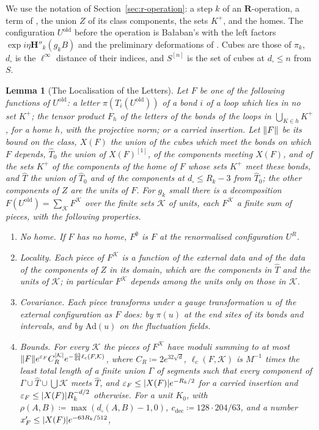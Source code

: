 \documentclass[11pt]{preprint}
\DeclarePairedDelimiter{\abs}{\lvert}{\rvert}
\DeclarePairedDelimiter{\norm}{\lVert}{\rVert}
\numberwithin{equation}{section}
\newtheorem{lemma}{Lemma}[section]
\theoremstyle{definition}
\theoremstyle{remark}
\theoremstyle{plain}
\begin{document}
We use the notation of Section~\ref{sec:r-operation}: a step $k$ of an $\mathbf R$-operation, a term of \cite[(1.72), p.~379]{BalabanLFR2}, the union $Z$ of its class components, the sets $K^+$, and the homes. The configuration $U^{\mathrm{old}}$ before the operation is Ba{\l}aban's \cite[(1.61)]{BalabanLFR2} with the left factors $\exp i\eta\mathbf H''_k(g_kB)$ and the preliminary deformations of \cite[p.~191, ll.~39--41]{BalabanLFR1}. Cubes are those of $\pi_k$, $d_\square$ is the $\ell^\infty$ distance of their indices, and $S^{[n]}$ is the set of cubes at $d_\square \leq n$ from $S$.

\begin{lemma}[The Localisation of the Letters]\label{lem:loop-localisation}
Let $F$ be one of the following functions of $U^{\mathrm{old}}$: a letter $\pi(T_i(U^{\mathrm{old}}))$ of a bond $i$ of a loop which lies in no set $K^+$; the tensor product $F_h$ of the letters of the bonds of the loops in $\bigcup_{K \in h}K^+$, for a home $h$, with the projective norm; or a carried insertion. Let $\norm F$ be its bound on the class, $X(F)$ the union of the cubes which meet the bonds on which $F$ depends, $\hat T_0$ the union of $X(F)^{[1]}$, of the components meeting $X(F)$, and of the sets $K^+$ of the components of the home of $F$ whose sets $K^+$ meet these bonds, and $\hat T$ the union of $\hat T_0$ and of the components at $d_\square \leq R_k - 3$ from $\hat T_0$; the other components of $Z$ are the \emph{units} of $F$. For $g_k$ small there is a decomposition $F(U^{\mathrm{old}}) = \sum_{\mathcal K}F^{\mathcal K}$ over the finite sets $\mathcal K$ of units, each $F^{\mathcal K}$ a finite sum of pieces, with the following properties.
\begin{enumerate}[label=(\roman*)]
\item \emph{No home.} If $F$ has no home, $F^\emptyset$ is $F$ at the renormalised configuration $U^R$.
\item \emph{Locality.} Each piece of $F^{\mathcal K}$ is a function of the external data and of the data of the components of $Z$ in its domain, which are the components in $\hat T$ and the units of $\mathcal K$; in particular $F^{\mathcal K}$ depends among the units only on those in $\mathcal K$.
\item \emph{Covariance.} Each piece transforms under a gauge transformation $u$ of the external configuration as $F$ does: by $\pi(u)$ at the end sites of its bonds and intervals, and by $\mathrm{Ad}(u)$ on the fluctuation fields.
\item \emph{Bounds.} For every $\mathcal K$ the pieces of $F^{\mathcal K}$ have moduli summing to at most $\norm Fe^{\varepsilon_F}C_R^{\abs{\mathcal K}}e^{-\frac{63}{64}\ell_c(F,\mathcal K)}$, where $C_R \coloneqq 2e^{32\sqrt d}$, $\ell_c(F, \mathcal K)$ is $M^{-1}$ times the least total length of a finite union $\Gamma$ of segments such that every component of $\Gamma \cup \hat T \cup \bigcup\mathcal K$ meets $\hat T$, and $\varepsilon_F \leq \abs{X(F)}e^{-R_k/2}$ for a carried insertion and $\varepsilon_F \leq \abs{X(F)}R_k^{-d/2}$ otherwise. For a unit $K_0$, with $\rho(A, B) \coloneqq \max(d_\square(A, B) - 1, 0)$, $c_{\mathrm{dec}} \coloneqq 128 \cdot 204/63$, and a number $x'_F \leq \abs{X(F)}e^{-63R_k/512}$,

\end{enumerate}
\end{lemma}
\end{document}
